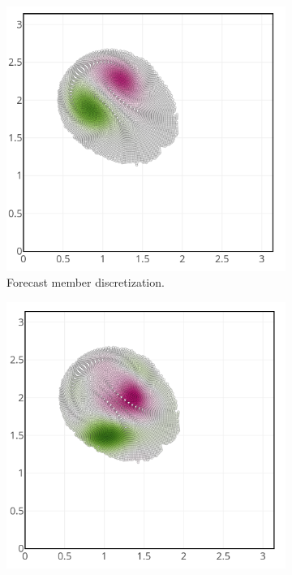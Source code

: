 \begin{figure}[h!]
    \centering
    \begin{subfigure}{0.32\textwidth}
        \centering
        \includegraphics[width=\linewidth]{./images/app2d/assim_member_forecast.png}
        \caption{Forecast member discretization.}
    \end{subfigure}
    \hfill
    \begin{subfigure}{0.32\textwidth}
        \centering
        \includegraphics[width=\linewidth]{./images/app2d/assim_member_ppf.png}

\end{subfigure}
\end{figure}
